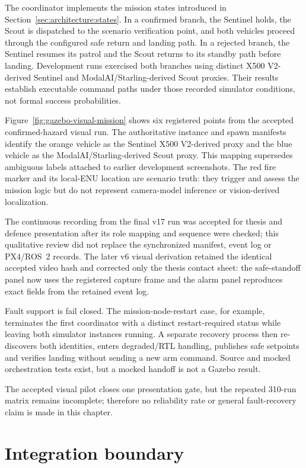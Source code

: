 The coordinator implements the mission states introduced in
Section~\ref{sec:architecture:states}. In a confirmed branch, the Sentinel
holds, the Scout is dispatched to the scenario verification point, and both
vehicles proceed through the configured safe return and landing path. In a
rejected branch, the Sentinel resumes its patrol and the Scout returns to its
standby path before landing. Development runs exercised both branches using
distinct X500 V2-derived Sentinel and ModalAI/Starling-derived Scout proxies.
Their results establish executable command paths under those recorded simulator
conditions, not formal success probabilities.

Figure~\ref{fig:gazebo-visual-mission} shows six registered points from the
accepted confirmed-hazard visual run. The authoritative instance and spawn
manifests identify the orange vehicle as the Sentinel X500 V2-derived proxy and
the blue vehicle as the ModalAI/Starling-derived Scout proxy. This mapping
supersedes ambiguous labels attached to earlier development screenshots. The
red fire marker and its local-ENU location are scenario truth: they trigger and
assess the mission logic but do not represent camera-model inference or
vision-derived localization.

The continuous recording from the final v17 run was accepted for thesis and
defence presentation after its role mapping and sequence were checked; this
qualitative review did not replace
the synchronized manifest, event log or PX4/ROS~2 records. The later v6 visual
derivation retained the identical accepted video hash and corrected only the
thesis contact sheet: the safe-standoff panel now uses the registered capture
frame and the alarm panel reproduces exact fields from the retained event log.

Fault support is fail closed. The mission-node-restart case, for example,
terminates the first coordinator with a distinct restart-required status while
leaving both simulator instances running. A separate recovery process then
re-discovers both identities, enters degraded/RTL handling, publishes safe
setpoints and verifies landing without sending a new arm command. Source and
mocked orchestration tests exist, but a mocked handoff is not a Gazebo result.

The accepted visual pilot closes one presentation gate, but the repeated
310-run matrix remains incomplete; therefore no reliability rate or general
fault-recovery claim is made in this chapter.

\section{Integration boundary}
\label{sec:implementation:boundary}

